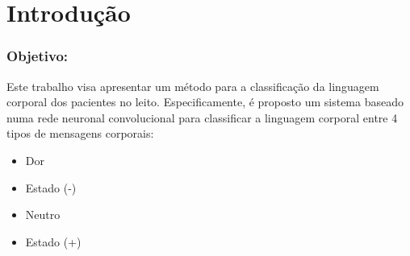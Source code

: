 \section{Introdução}

\begin{frame}
\frametitle{Objetivo:}
Este trabalho visa apresentar um método para a classificação 
da linguagem corporal dos pacientes no leito.
Especificamente, 
é proposto um sistema baseado numa rede neuronal 
convolucional para classificar a linguagem corporal entre 4 tipos de mensagens corporais:
\begin{itemize}
    \item Dor
    \item Estado (-) 
    \item Neutro
    \item Estado (+)
\end{itemize}
\end{frame}


